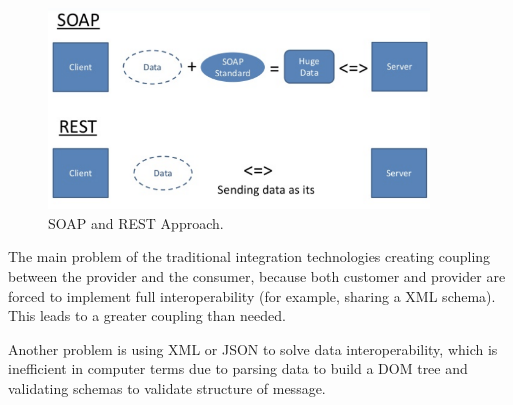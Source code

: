 \begin{figure}[!htb]
  \centering
  \includegraphics[width=0.9\textwidth]{Figures/soap-rest.png}
  \caption[SOAP and REST Approach.]{SOAP and REST Approach.}
  \label{fig:soaprest}
\end{figure}

The main problem of the traditional integration technologies creating coupling between the provider and the consumer, because both customer and provider are forced to implement full interoperability (for example, sharing a XML schema). This leads to a greater coupling than needed.

 Another problem is using XML or JSON to solve data interoperability, which is inefficient in computer terms due to parsing data to build a DOM tree and validating schemas to validate structure of message.


